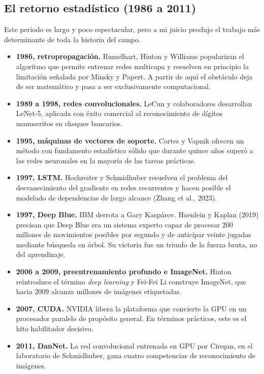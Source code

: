 \documentclass[12pt,letterpaper,oneside]{article}
\begin{document}
\subsection{El retorno estadístico (1986 a 2011)}

Este periodo es largo y poco espectacular, pero a mi juicio produjo el trabajo más determinante de toda la historia del campo.

\begin{itemize}[leftmargin=1.4cm,itemsep=0.25em]
  \item \textbf{1986, retropropagación.} Rumelhart, Hinton y Williams popularizan el algoritmo que permite entrenar redes multicapa y resuelven en principio la limitación señalada por Minsky y Papert. A partir de aquí el obstáculo deja de ser matemático y pasa a ser exclusivamente computacional.
  \item \textbf{1989 a 1998, redes convolucionales.} LeCun y colaboradores desarrollan LeNet-5, aplicada con éxito comercial al reconocimiento de dígitos manuscritos en cheques bancarios.
  \item \textbf{1995, máquinas de vectores de soporte.} Cortes y Vapnik ofrecen un método con fundamento estadístico sólido que durante quince años superó a las redes neuronales en la mayoría de las tareas prácticas.
  \item \textbf{1997, LSTM.} Hochreiter y Schmidhuber resuelven el problema del desvanecimiento del gradiente en redes recurrentes y hacen posible el modelado de dependencias de largo alcance (Zhang et al., 2023).
  \item \textbf{1997, Deep Blue.} IBM derrota a Gary Kaspárov. Haenlein y Kaplan (2019) precisan que Deep Blue era un sistema experto capaz de procesar 200 millones de movimientos posibles por segundo y de anticipar veinte jugadas mediante búsqueda en árbol. Su victoria fue un triunfo de la fuerza bruta, no del aprendizaje.
  \item \textbf{2006 a 2009, preentrenamiento profundo e ImageNet.} Hinton reintroduce el término \textit{deep learning} y Fei-Fei Li construye ImageNet, que hacia 2009 alcanza millones de imágenes etiquetadas.
  \item \textbf{2007, CUDA.} NVIDIA libera la plataforma que convierte la GPU en un procesador paralelo de propósito general. En términos prácticos, este es el hito habilitador decisivo.
  \item \textbf{2011, DanNet.} La red convolucional entrenada en GPU por Cireşan, en el laboratorio de Schmidhuber, gana cuatro competencias de reconocimiento de imágenes.
\end{itemize}
\end{document}
